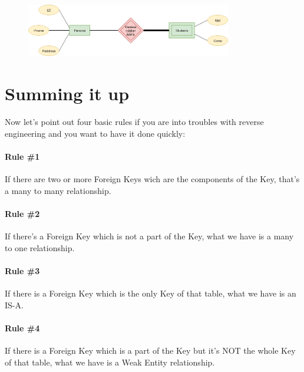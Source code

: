 \documentclass[12pt, oneside]{report}
\begin{document}
\begin{figure}[H]
	\centering
	\includegraphics[width=0.8\textwidth,keepaspectratio]{diagram6_03.png}
	\label{diagram6_03}
\end{figure}

\section{Summing it up}
Now let's point out four basic rules if you are into troubles with reverse engineering and you want to have it done quickly:
\paragraph{Rule \#1} If there are two or more Foreign Keys wich are the components of the Key, that's a many to many relationship.
\paragraph{Rule \#2} If there's a Foreign Key which is not a part of the Key, what we have is a many to one relationship.
\paragraph{Rule \#3} If there is a Foreign Key which is the only Key of that table, what we have is an IS-A.
\paragraph{Rule \#4} If there is a Foreign Key which is a part of the Key but it's NOT the whole Key of that table, what we have is a Weak Entity relationship.
\end{document}
